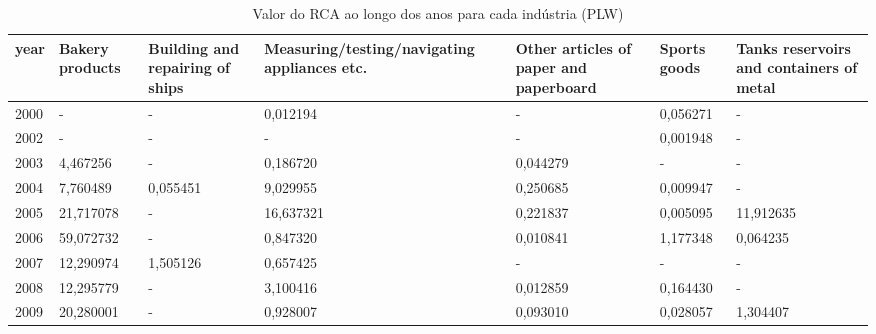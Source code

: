 \begin{table}
\centering
\caption{Valor do RCA ao longo dos anos para cada indústria (PLW)}
\begin{tabular}{p{1cm}p{2cm}p{2cm}p{2cm}p{2cm}p{2cm}p{2cm}}
\toprule
 year &  Bakery products &  Building and repairing of ships &  Measuring/testing/navigating appliances etc. &  Other articles of paper and paperboard &  Sports goods &  Tanks reservoirs and containers of metal \\
\midrule
 2000 &                - &                                - &                                      0,012194 &                                       - &      0,056271 &                                         - \\
 2002 &                - &                                - &                                             - &                                       - &      0,001948 &                                         - \\
 2003 &         4,467256 &                                - &                                      0,186720 &                                0,044279 &             - &                                         - \\
 2004 &         7,760489 &                         0,055451 &                                      9,029955 &                                0,250685 &      0,009947 &                                         - \\
 2005 &        21,717078 &                                - &                                     16,637321 &                                0,221837 &      0,005095 &                                 11,912635 \\
 2006 &        59,072732 &                                - &                                      0,847320 &                                0,010841 &      1,177348 &                                  0,064235 \\
 2007 &        12,290974 &                         1,505126 &                                      0,657425 &                                       - &             - &                                         - \\
 2008 &        12,295779 &                                - &                                      3,100416 &                                0,012859 &      0,164430 &                                         - \\
 2009 &        20,280001 &                                - &                                      0,928007 &                                0,093010 &      0,028057 &                                  1,304407 \\

\end{tabular}
\end{table}
